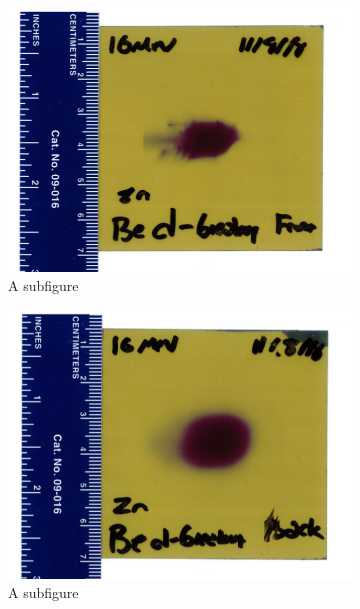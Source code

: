 \documentclass[twoside,english]{uiofysmaster/uiofysmaster}
\begin{document}
\begin{figure} [H]
\centering
\begin{subfigure}{.5\textwidth}
  \centering
  \includegraphics[width=1\linewidth]{16MeV_front.jpeg}
  \caption{A subfigure}
  \label{fig:sub1}
\end{subfigure}%
\begin{subfigure}{.5\textwidth}
  \centering
  \includegraphics[width=1\linewidth]{16MeV_back.jpeg}
  \caption{A subfigure}
  \label{fig:sub2}
\end{subfigure}
\begin{subfigure}{.5\textwidth}
  \centering

\end{subfigure}
\end{figure}
\end{document}

